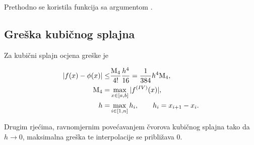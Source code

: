 Prethodno se koristila  funkcija sa argumentom .

\subsection{Greška kubičnog splajna}

Za kubični splajn ocjena greške je

\begin{align}
|f(x)-\phi(x)|\leq&\frac{\text{M}_4}{4!}\frac{h^4}{16}={1\over384}h^4\text{M}_4,\\
\text{M}_4=&\max_{x\in[a,b]}|f^{(IV)}(x)|,\\
h=&\max_{i\in[1,n]}h_i,\qquad h_i=x_{i+1}-x_i.
\end{align}

Drugim rjećima, ravnomjernim povećavanjem čvorova kubičnog splajna tako da $h\to0$, maksimalna greška te interpolacije se približava 0.
